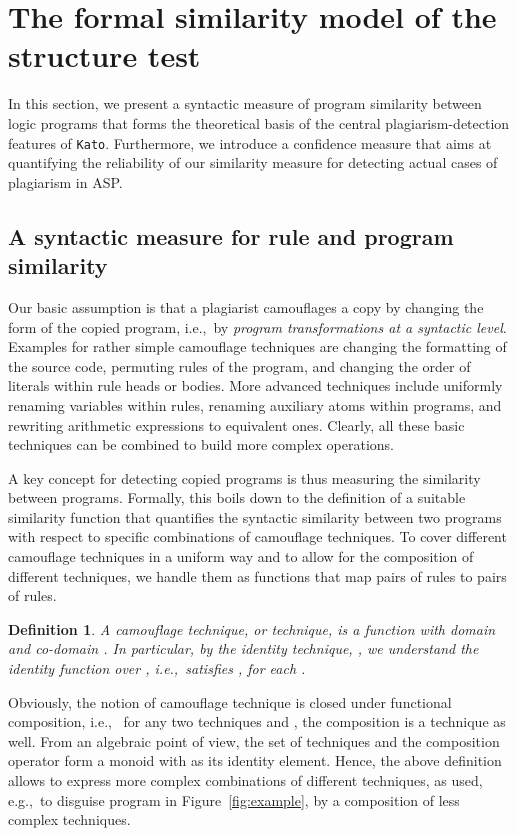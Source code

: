 \documentclass{tlp}
\newcommand{\iec}[0]{i.e.,\ }
\newcommand{\egc}[0]{e.g.,\ }
\newcommand{\kato}[0]{\texttt{Kato}\xspace}
\newtheorem{definition}{Definition}
\begin{document}
\section{The formal similarity model of the structure test}\label{sec:theory}


In this section, we present a syntactic measure of program similarity between logic programs that forms the theoretical basis of the central plagiarism-detection features of \kato.
Furthermore, we introduce a  confidence measure that aims at quantifying the  reliability  of our similarity measure for detecting actual cases of plagiarism in ASP. 

\subsection{A syntactic measure for rule and program similarity}

Our basic assumption is that a plagiarist camouflages a copy by changing the form of the copied program, \iec by \emph{program transformations at a syntactic level}.  
Examples for rather simple camouflage techniques  are changing the formatting of the source code,
permuting rules of the program, and changing the order of literals within rule heads or bodies. 
More advanced techniques include uniformly renaming variables within rules, renaming auxiliary atoms
within programs, and rewriting   arithmetic expressions to equivalent ones.  
Clearly, all these basic techniques can be combined to build more complex operations.

A key concept for detecting copied programs is thus measuring the similarity between programs. 
Formally, this boils down to the definition of a suitable similarity function that quantifies the syntactic similarity between two programs  with respect to specific combinations of camouflage techniques. 
To cover different camouflage techniques in a uniform way and to allow for the composition of different techniques, we handle them as functions that map pairs of rules to pairs of rules.  

\begin{definition}\label{def:technique}
A \emph{camouflage technique}, or \emph{technique}, is a function
with domain and co-domain . 
In particular, by the \emph{identity technique}, , we understand the identity function over , \iec  satisfies , for each .
\end{definition} 

Obviously, the notion of camouflage technique is closed under functional composition, \iec
for any two techniques  and , the composition  is
a technique as well.
From an algebraic point of view, the set of techniques and the composition operator form a monoid  with
 as its identity element. 
Hence, the above definition allows to express more complex combinations of different techniques, as used, \egc to disguise program  
in Figure~\ref{fig:example}, by a composition of less complex  techniques. 
  
\end{document}

